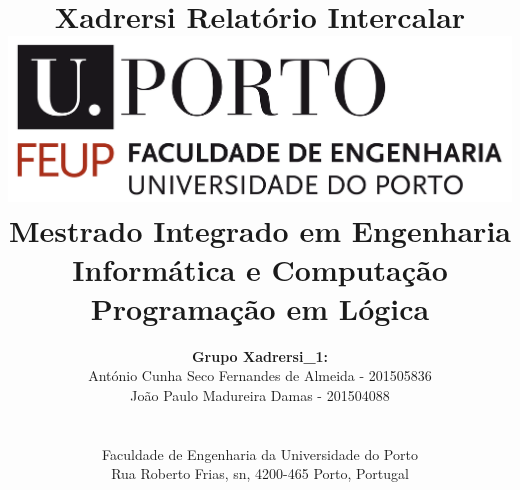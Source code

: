 \documentclass[a4paper]{article}
\begin{document}
\setlength{\textwidth}{16cm}
\setlength{\textheight}{22cm}

\title{\Huge\textbf{Xadrersi}\linebreak\linebreak\linebreak
\Large\textbf{Relatório Intercalar}\linebreak\linebreak
\linebreak\linebreak
\includegraphics[scale=0.1]{feup-logo.png}\linebreak\linebreak
\linebreak\linebreak
\Large{Mestrado Integrado em Engenharia Informática e Computação} \linebreak\linebreak
\Large{Programação em Lógica}\linebreak
}

\author{\textbf{Grupo Xadrersi\_1:}\\
António Cunha Seco Fernandes de Almeida - 201505836 \\
João Paulo Madureira Damas - 201504088 \\
\linebreak\linebreak \\
 \\ Faculdade de Engenharia da Universidade do Porto \\ Rua Roberto Frias, s\/n, 4200-465 Porto, Portugal \linebreak\linebreak\linebreak
\linebreak\linebreak\vspace{1cm}}

\maketitle
\thispagestyle{empty}
\end{document}
